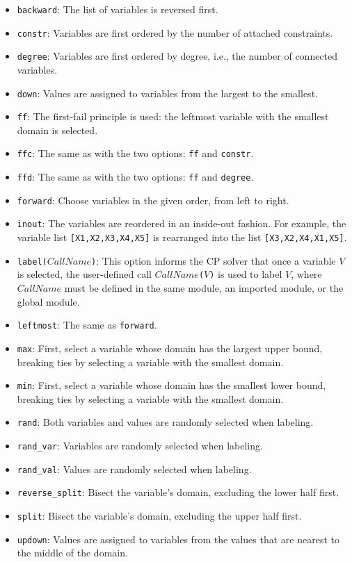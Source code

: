 \begin{itemize}
\item \texttt{backward}: The list of variables is reversed first.
\item \texttt{constr}: Variables are first ordered by the number of attached constraints.
\item \texttt{degree}: Variables are first ordered by degree, i.e., the number of connected variables.
\item \texttt{down}: Values are assigned to variables from the largest to the smallest.
\item \texttt{ff}: The first-fail principle is used: the leftmost variable with the smallest domain is selected.
\item \texttt{ffc}: The same as with the two options: \texttt{ff} and \texttt{constr}.
\item \texttt{ffd}: The same as with the two options: \texttt{ff} and \texttt{degree}.
\item \texttt{forward}: Choose variables in the given order, from left to right.
\item \texttt{inout}: The variables are reordered in an inside-out fashion. For example, the variable list \texttt{[X1,X2,X3,X4,X5]} is rearranged into the list \texttt{[X3,X2,X4,X1,X5]}.
\item \texttt{label($CallName$)}: This option informs the CP solver that once a variable $V$ is selected, the user-defined call \texttt{$CallName$($V$)} is used to label $V$, where $CallName$ must be defined in the same module, an imported module, or the global module.
\item \texttt{leftmost}: The same as \texttt{forward}.
\item \texttt{max}: First, select a variable whose domain has the largest upper bound, breaking ties by selecting a variable with the smallest domain.
\item \texttt{min}: First, select a variable whose domain has the smallest lower bound, breaking ties by selecting a variable with the smallest domain.
\item \texttt{rand}: Both variables and values are randomly selected when labeling.
\item \texttt{rand\_var}: Variables are randomly selected when labeling.
\item \texttt{rand\_val}: Values are randomly selected when labeling.
\item \texttt{reverse\_split}: Bisect the variable's domain, excluding the lower half first.
\item \texttt{split}: Bisect the variable's domain, excluding the upper half first.
\item \texttt{updown}: Values are assigned to variables from the values that are nearest to the middle of the domain.
\end{itemize}

